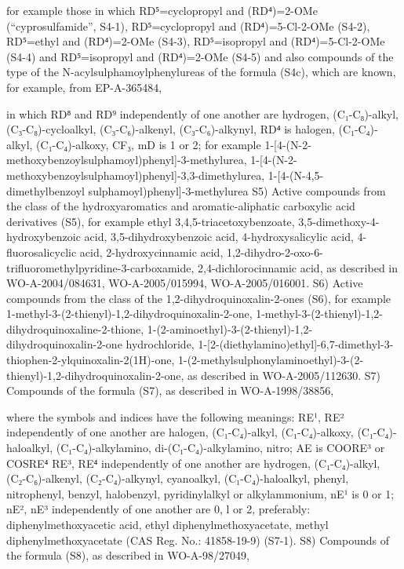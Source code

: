 \documentclass[11pt,a4paper]{article}
\begin{document}
for example those in which RD⁵=cyclopropyl and (RD⁴)=2-OMe (“cyprosulfamide”, S4-1), RD⁵=cyclopropyl and (RD⁴)=5-Cl-2-OMe (S4-2), RD⁵=ethyl and (RD⁴)=2-OMe (S4-3), RD⁵=isopropyl and (RD⁴)=5-Cl-2-OMe (S4-4) and RD⁵=isopropyl and (RD⁴)=2-OMe (S4-5) and also compounds of the type of the N-acylsulphamoylphenylureas of the formula (S4c), which are known, for example, from EP-A-365484,

in which RD⁸ and RD⁹ independently of one another are hydrogen, (C₁-C₈)-alkyl, (C₃-C₈)-cycloalkyl, (C₃-C₆)-alkenyl, (C₃-C₆)-alkynyl, RD⁴ is halogen, (C₁-C₄)-alkyl, (C₁-C₄)-alkoxy, CF₃, mD is 1 or 2; for example 1-[4-(N-2-methoxybenzoylsulphamoyl)phenyl]-3-methylurea, 1-[4-(N-2-methoxybenzoylsulphamoyl)phenyl]-3,3-dimethylurea, 1-[4-(N-4,5-dimethylbenzoyl sulphamoyl)phenyl]-3-methylurea S5) Active compounds from the class of the hydroxyaromatics and aromatic-aliphatic carboxylic acid derivatives (S5), for example ethyl 3,4,5-triacetoxybenzoate, 3,5-dimethoxy-4-hydroxybenzoic acid, 3,5-dihydroxybenzoic acid, 4-hydroxysalicylic acid, 4-fluorosalicyclic acid, 2-hydroxycinnamic acid, 1,2-dihydro-2-oxo-6-trifluoromethylpyridine-3-carboxamide, 2,4-dichlorocinnamic acid, as described in WO-A-2004/084631, WO-A-2005/015994, WO-A-2005/016001. S6) Active compounds from the class of the 1,2-dihydroquinoxalin-2-ones (S6), for example 1-methyl-3-(2-thienyl)-1,2-dihydroquinoxalin-2-one, 1-methyl-3-(2-thienyl)-1,2-dihydroquinoxaline-2-thione, 1-(2-aminoethyl)-3-(2-thienyl)-1,2-dihydroquinoxalin-2-one hydrochloride, 1-[2-(diethylamino)ethyl]-6,7-dimethyl-3-thiophen-2-ylquinoxalin-2(1H)-one, 1-(2-methylsulphonylaminoethyl)-3-(2-thienyl)-1,2-dihydroquinoxalin-2-one, as described in WO-A-2005/112630. S7) Compounds of the formula (S7), as described in WO-A-1998/38856,

where the symbols and indices have the following meanings: RE¹, RE² independently of one another are halogen, (C₁-C₄)-alkyl, (C₁-C₄)-alkoxy, (C₁-C₄)-haloalkyl, (C₁-C₄)-alkylamino, di-(C₁-C₄)-alkylamino, nitro; AE is COORE³ or COSRE⁴ RE³, RE⁴ independently of one another are hydrogen, (C₁-C₄)-alkyl, (C₂-C₆)-alkenyl, (C₂-C₄)-alkynyl, cyanoalkyl, (C₁-C₄)-haloalkyl, phenyl, nitrophenyl, benzyl, halobenzyl, pyridinylalkyl or alkylammonium, nE¹ is 0 or 1; nE², nE³ independently of one another are 0, l or 2, preferably: diphenylmethoxyacetic acid, ethyl diphenylmethoxyacetate, methyl diphenylmethoxyacetate (CAS Reg. No.: 41858-19-9) (S7-1). S8) Compounds of the formula (S8), as described in WO-A-98/27049,
\end{document}
